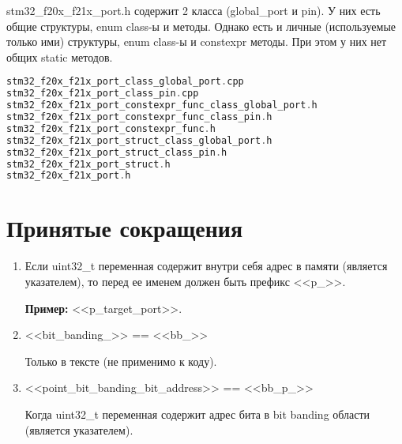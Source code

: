 \begin{enumerate}
	stm32\_f20x\_f21x\_port.h содержит 2 класса (global\_port и pin). У них есть общие структуры, enum class-ы и методы. Однако есть и личные (используемые только ими) структуры, enum class-ы и constexpr методы. При этом у них нет общих static методов.
	\begin{lstlisting}[language=C++,
	frame=tlBR]
stm32_f20x_f21x_port_class_global_port.cpp
stm32_f20x_f21x_port_class_pin.cpp 
stm32_f20x_f21x_port_constexpr_func_class_global_port.h
stm32_f20x_f21x_port_constexpr_func_class_pin.h
stm32_f20x_f21x_port_constexpr_func.h
stm32_f20x_f21x_port_struct_class_global_port.h
stm32_f20x_f21x_port_struct_class_pin.h
stm32_f20x_f21x_port_struct.h
stm32_f20x_f21x_port.h
	\end{lstlisting}
\end{enumerate}

\section{Принятые сокращения}
\label{sk:0}
\begin{enumerate}
	\item Если uint32\_t переменная содержит внутри себя адрес в памяти (является указателем), то перед ее именем должен быть префикс <<p\_>>.
	
	\textbf{Пример:} <<p\_target\_port>>.
	\item <<bit\_banding\_>> == <<bb\_>>
	
	Только в тексте (не применимо к коду).
	\item <<point\_bit\_banding\_bit\_address>> == <<bb\_p\_>>
	
	Когда uint32\_t переменная содержит адрес бита в bit banding области (является указателем).
	
\end{enumerate}

